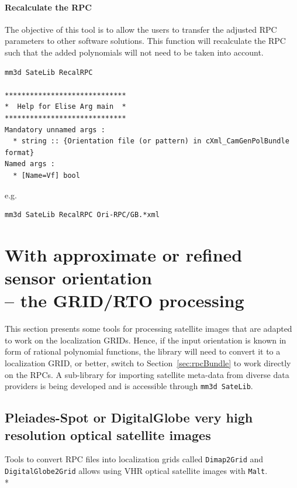 \paragraph*{Recalculate the RPC}
The objective of this tool is to allow the users to transfer the adjusted RPC parameters to other software solutions. This function will recalculate the RPC such that the added polynomials will not need to be taken into account.

\begin{verbatim}
mm3d SateLib RecalRPC

*****************************
*  Help for Elise Arg main  *
*****************************
Mandatory unnamed args : 
  * string :: {Orientation file (or pattern) in cXml_CamGenPolBundle format}
Named args : 
  * [Name=Vf] bool

\end{verbatim}

e.g.
\begin{verbatim}
mm3d SateLib RecalRPC Ori-RPC/GB.*xml
\end{verbatim}





\section{With approximate or refined sensor orientation \\-- the GRID/RTO processing}\label{sec:gridProc}
This section presents some tools for processing satellite images that are adapted to work on the localization GRIDs. Hence, if the input orientation is known in form of rational polynomial functions, the library will need to convert it to a localization GRID, or better, switch to Section~\ref{sec:rpcBundle} to work directly on the RPCs. A sub-library for importing satellite meta-data from diverse data providers is being developed and is accessible through {\tt mm3d SateLib}.

\subsection{Pleiades-Spot or DigitalGlobe very high resolution optical satellite images}

Tools to convert RPC files into localization grids called {\tt Dimap2Grid} and {\tt DigitalGlobe2Grid} allows using VHR optical satellite images with {\tt Malt}.\\*


